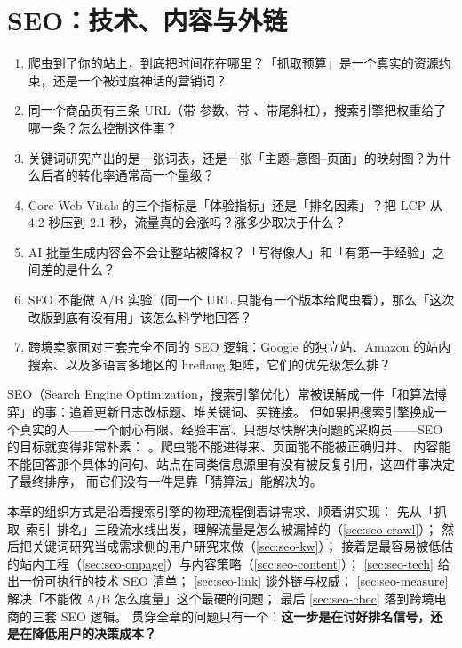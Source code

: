 \chapter{SEO：技术、内容与外链}
\label{ch:seo}

\begin{insight}[本章要解决的问题]
\begin{enumerate}
  \item 爬虫到了你的站上，到底把时间花在哪里？「抓取预算」是一个真实的资源约束，还是一个被过度神话的营销词？
  \item 同一个商品页有三条 URL（带  参数、带 、带尾斜杠），搜索引擎把权重给了哪一条？怎么控制这件事？
  \item 关键词研究产出的是一张词表，还是一张「主题--意图--页面」的映射图？为什么后者的转化率通常高一个量级？
  \item Core Web Vitals 的三个指标是「体验指标」还是「排名因素」？把 LCP 从 4.2 秒压到 2.1 秒，流量真的会涨吗？涨多少取决于什么？
  \item AI 批量生成内容会不会让整站被降权？「写得像人」和「有第一手经验」之间差的是什么？
  \item SEO 不能做 A/B 实验（同一个 URL 只能有一个版本给爬虫看），那么「这次改版到底有没有用」该怎么科学地回答？
  \item 跨境卖家面对三套完全不同的 SEO 逻辑：Google 的独立站、Amazon 的站内搜索、以及多语言多地区的 hreflang 矩阵，它们的优先级怎么排？
\end{enumerate}
\end{insight}

SEO（Search Engine Optimization，搜索引擎优化）常被误解成一件「和算法博弈」的事：追着更新日志改标题、堆关键词、买链接。
但如果把搜索引擎换成一个真实的人——一个耐心有限、经验丰富、只想尽快解决问题的采购员——SEO 的目标就变得非常朴素：
。爬虫能不能进得来、页面能不能被正确归并、
内容能不能回答那个具体的问句、站点在同类信息源里有没有被反复引用，这四件事决定了最终排序，
而它们没有一件是靠「猜算法」能解决的。

本章的组织方式是沿着搜索引擎的物理流程倒着讲需求、顺着讲实现：
先从「抓取--索引--排名」三段流水线出发，理解流量是怎么被漏掉的（\cref{sec:seo-crawl}）；
然后把关键词研究当成需求侧的用户研究来做（\cref{sec:seo-kw}）；
接着是最容易被低估的站内工程（\cref{sec:seo-onpage}）与内容策略（\cref{sec:seo-content}）；
\cref{sec:seo-tech} 给出一份可执行的技术 SEO 清单；
\cref{sec:seo-link} 谈外链与权威；
\cref{sec:seo-measure} 解决「不能做 A/B 怎么度量」这个最硬的问题；
最后 \cref{sec:seo-cbec} 落到跨境电商的三套 SEO 逻辑。
贯穿全章的问题只有一个：\textbf{这一步是在讨好排名信号，还是在降低用户的决策成本？}

